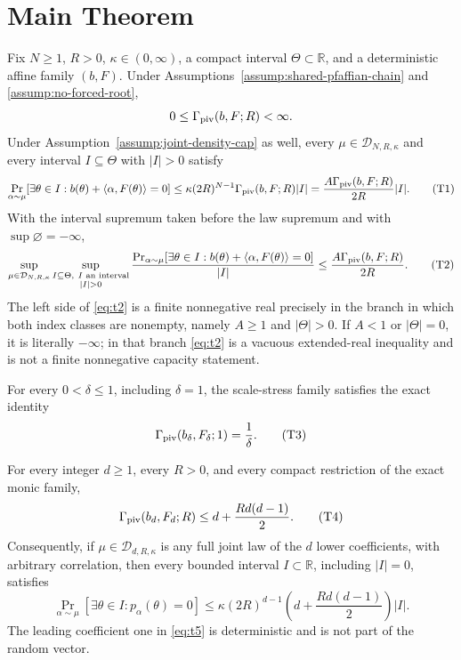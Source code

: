 \section{Main Theorem}

\begin{theorem}
\label{thm:main}
Fix $N\geq1$, $R>0$, $\kappa\in(0,\infty)$, a compact interval
$\Theta\subset\mathbb R$, and a deterministic affine family $(b,F)$.
Under Assumptions~\ref{assump:shared-pfaffian-chain} and
\ref{assump:no-forced-root},
\[
0\leq\Gamma_{\rm piv}(b,F;R)<\infty.
\]
Under Assumption~\ref{assump:joint-density-cap} as well, every
$\mu\in\mathcal D_{N,R,\kappa}$ and every interval $I\subseteq\Theta$
with $|I|>0$ satisfy
\[
\Pr_{\alpha\sim\mu}\!\left[\exists\theta\in I:
 b(\theta)+\langle\alpha,F(\theta)\rangle=0\right]
\leq
\kappa(2R)^{N-1}\Gamma_{\rm piv}(b,F;R)|I|
=\frac{A\Gamma_{\rm piv}(b,F;R)}{2R}|I|.
\tag{T1}\label{eq:t1}
\]
With the interval supremum taken before the law supremum and with
$\sup\varnothing=-\infty$,
\[
\sup_{\mu\in\mathcal D_{N,R,\kappa}}
\sup_{\substack{I\subseteq\Theta,\ I\text{ an interval}\\|I|>0}}
\frac{\Pr_{\alpha\sim\mu}[\exists\theta\in I:
 b(\theta)+\langle\alpha,F(\theta)\rangle=0]}{|I|}
\leq\frac{A\Gamma_{\rm piv}(b,F;R)}{2R}.
\tag{T2}\label{eq:t2}
\]
The left side of \eqref{eq:t2} is a finite nonnegative real precisely in
the branch in which both index classes are nonempty, namely
$A\geq1$ and $|\Theta|>0$.  If $A<1$ or $|\Theta|=0$, it is literally
$-\infty$; in that branch \eqref{eq:t2} is a vacuous extended-real
inequality and is not a finite nonnegative capacity statement.

For every $0<\delta\leq1$, including $\delta=1$, the scale-stress family
satisfies the exact identity
\[
\Gamma_{\rm piv}(b_\delta,F_\delta;1)=\frac1\delta.
\tag{T3}\label{eq:t3}
\]

For every integer $d\geq1$, every $R>0$, and every compact restriction of
the exact monic family,
\[
\Gamma_{\rm piv}(b_d,F_d;R)
\leq d+\frac{R d(d-1)}2.
\tag{T4}\label{eq:t4}
\]
Consequently, if $\mu\in\mathcal D_{d,R,\kappa}$ is any full joint law of
the $d$ lower coefficients, with arbitrary correlation, then every bounded
interval $I\subset\mathbb R$, including $|I|=0$, satisfies
\[
\Pr_{\alpha\sim\mu}\!\left[\exists\theta\in I:p_\alpha(\theta)=0\right]
\leq
\kappa(2R)^{d-1}
\left(d+\frac{R d(d-1)}2\right)|I|.
\tag{T5}\label{eq:t5}
\]
The leading coefficient one in \eqref{eq:t5} is deterministic and is not
part of the random vector.


\end{theorem}
